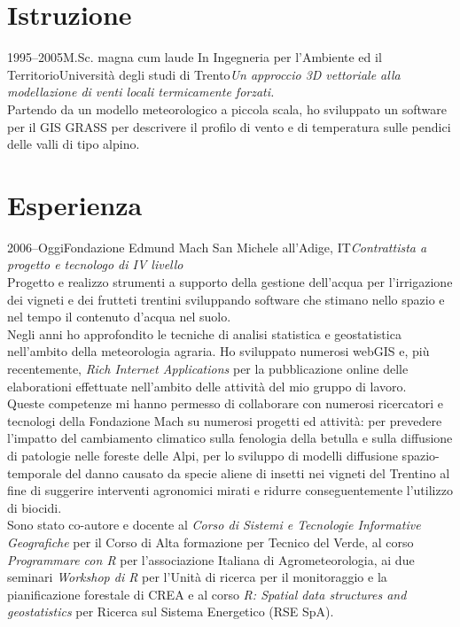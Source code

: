 \documentclass{curriculum}
\begin{document}
    \section{Istruzione}
    \begin{entrylist}
    \entry
        {1995--2005}{M.Sc. magna cum laude {\normalfont In Ingegneria per l'Ambiente ed il Territorio}}{Università degli studi di Trento}{\emph{Un approccio 3D vettoriale alla modellazione di venti locali termicamente forzati.}\hfill\vspace{2pt}\\
        Partendo da un modello meteorologico a piccola scala, ho sviluppato un software per il GIS GRASS per descrivere il profilo di vento e di temperatura sulle pendici delle valli di tipo alpino.}
    \end{entrylist}
    
    
    \section{Esperienza}
    \begin{entrylist}
    \entry 
        {2006--Oggi}{Fondazione Edmund Mach} {San Michele all'Adige, IT}{\emph{Contrattista a progetto e tecnologo di IV livello}\hfill\vspace{3pt}\\
        Progetto e realizzo strumenti a supporto della gestione dell'acqua per l'irrigazione dei vigneti e dei frutteti trentini sviluppando software che stimano nello spazio e nel tempo il contenuto d'acqua nel suolo.
        \\Negli anni ho approfondito le tecniche di analisi statistica e geostatistica nell'ambito della meteorologia agraria. Ho sviluppato numerosi webGIS e, più recentemente, \textit{Rich Internet Applications} per la pubblicazione online delle elaborationi effettuate nell'ambito delle attività del mio gruppo di lavoro. 
        \\Queste competenze mi hanno permesso di collaborare con numerosi ricercatori e tecnologi della Fondazione Mach su numerosi progetti ed attività: per prevedere l'impatto del cambiamento climatico sulla fenologia della betulla e sulla diffusione di patologie nelle foreste delle Alpi, per lo sviluppo di modelli diffusione spazio-temporale del danno causato da specie aliene di insetti nei vigneti del Trentino al fine di suggerire interventi agronomici mirati e ridurre conseguentemente l'utilizzo di biocidi.
        \\Sono stato co-autore e docente al \textit{Corso di Sistemi e Tecnologie Informative Geografiche} per il Corso di Alta formazione per Tecnico del Verde, al corso \textit{Programmare con R} per l'associazione Italiana di Agrometeorologia, ai due seminari \textit{Workshop di R} per l'Unità di ricerca per il monitoraggio e la pianificazione forestale di CREA e al corso \textit{R: Spatial data structures and geostatistics} per Ricerca sul Sistema Energetico (RSE SpA).} 
    \end{entrylist}
    
\end{document}
